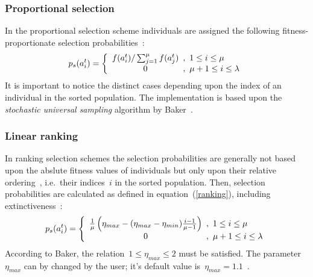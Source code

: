 \subsubsection{Proportional selection}

In the proportional selection scheme individuals are assigned the 
following fitness-propor\-ti\-o\-na\-te selection 
probabilities~\cite{Hol75,BH91c}:
%
\begin{equation}
	p_s(a^t_i) = \left\{
	\begin{array}{c@{\hspace{0.5em},\hspace{0.5em}}l}
		f(a^t_i) / \sum_{j=1}^{\mu} f(a^t_j)	
				& 1 \leq i \leq \mu		\\
		0		& \mu+1 \leq i \leq \lambda	\\
	\end{array} \right.%
\end{equation}
%
It is important to notice the distinct cases depending upon the index
of an individual in the sorted population.
The implementation is based upon the {\em stochastic universal sampling\/}
algorithm by Baker~\cite{Bak87}.

\subsubsection{Linear ranking}

In ranking selection schemes the selection probabilities are generally not
based upon the abslute fitness values of individuals but only upon their
relative ordering~\cite{Bak85}, i.e.~their indices~$i$ in the
sorted population.
Then, selection probabilities are calculated as defined in 
equation~(\ref{ranking}), including extinctiveness~\cite{BH91c}:
%
\begin{equation}\label{ranking}
	p_s(a^t_i) = \left\{
	\begin{array}{c@{\hspace{0.5em},\hspace{0.5em}}l}
		\frac{1}{\mu}
		\left(\eta_{max} - (\eta_{max} - \eta_{min})
			\frac{i - 1}{\mu - 1}
		\right)	
				& 1 \leq i \leq \mu		\\
		0		& \mu+1 \leq i \leq \lambda	\\
	\end{array} \right.%
\end{equation}
%
According to Baker, the relation~$1 \leq \eta_{max} \leq 2$ must be
satisfied.
The parameter~$\eta_{max}$ can by changed by the user; it's default
value is~$\eta_{max} = 1.1$~\cite{Bak85}.

